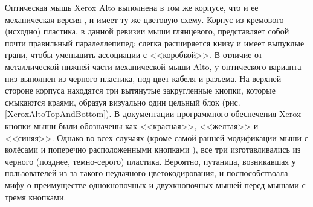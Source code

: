 \documentclass[11pt, a4paper]{article}
\begin{document}
Оптическая мышь Xerox Alto выполнена в том же корпусе, что и ее механическая версия \cite{vlsi82}, и имеет ту же цветовую схему. Корпус из кремового (исходно) пластика, в данной ревизии мыши глянцевого, представляет собой почти правильный паралеллепипед: слегка расширяется книзу и имеет выпуклые грани, чтобы уменьшить ассоциации с <<коробкой>>. В отличие от металлической нижней части механической мыши Alto, y оптического варианта низ выполнен из черного пластика, под цвет кабеля и разъема. На верхней стороне корпуса находятся три вытянутые закругленные кнопки, которые смыкаются краями, образуя визуально один цельный блок (рис. \ref{XeroxAltoTopAndBottom}).  В документации программного обеспечения Xerox кнопки мыши были обозначены как <<красная>>, <<желтая>> и <<синяя>>. Однако во всех случаях (кроме самой ранней модификации мыши с колёсами и поперечно расположенными кнопками \cite{vlsi81}), все три  изготавливались из черного (позднее, темно-серого) пластика. Вероятно, путаница, возникавшая у пользователей из-за такого неудачного цветокодирования, и поспособствоала мифу о преимуществе однокнопочных и двухкнопочных мышей перед мышами с тремя кнопками.
\end{document}
